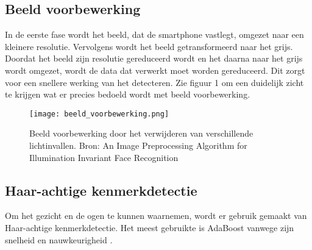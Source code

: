\subsection{Beeld voorbewerking}
In de eerste fase wordt het beeld, dat de smartphone vastlegt, omgezet naar een kleinere resolutie. Vervolgens wordt het beeld getransformeerd naar het grijs. Doordat het beeld zijn resolutie gereduceerd wordt en het daarna naar het grijs wordt omgezet, wordt de data dat verwerkt moet worden gereduceerd. Dit zorgt voor een snellere werking van het detecteren. Zie figuur 1 om een duidelijk zicht te krijgen wat er precies bedoeld wordt met beeld voorbewerking.
\begin{figure}[h]
    \centering
    \texttt{[image: beeld\_voorbewerking.png]}
    \caption{Beeld voorbewerking door het verwijderen van verschillende lichtinvallen. Bron: An Image Preprocessing Algorithm for Illumination Invariant Face Recognition \autocite{RalphBrajovic}}
\end{figure}


\subsection{Haar-achtige kenmerkdetectie}
Om het gezicht en de ogen te kunnen waarnemen, wordt er gebruik gemaakt van Haar-achtige kenmerkdetectie. Het meest gebruikte is AdaBoost vanwege zijn snelheid en nauwkeurigheid \autocite{Viola2004}.


